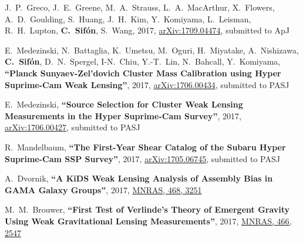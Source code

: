 \documentclass{article}
\def\myself{\textbf{\color{red} C.~Sif\'on}}
\def\apj{ApJ}
\def\mnras{MNRAS}
\def\pasj{PASJ}
\newcommand{\submitted}[1]{submitted to #1}
\newcommand{\paper}[1]{\textbf{``#1''}}
\begin{document}
\vspace{-0.5cm}
\begin{etaremune}

\item
J.~P.~Greco, J.~E.~Greene, M.~A.~Strauss, L.~A.~MacArthur, X.~Flowers, 
A.~D.~Goulding, S.~Huang, J.~H.~Kim, Y.~Komiyama, L.~Leisman, R.~H.~Lupton, 
\myself, S.~Wang,
2017, \href{http://adsabs.harvard.edu/abs/2017arXiv170904474}{arXiv:1709.04474},
\submitted{\apj}

\item
E.~Medezinski, N.~Battaglia, K.~Umetsu, M.~Oguri, H.~Miyatake, A.~Nishizawa,
\myself, D.~N.~Spergel, I-N.~Chiu, Y.-T.~Lin, N.~Bahcall, Y.~Komiyama,
\paper{Planck Sunyaev-Zel'dovich Cluster Mass Calibration using Hyper 
Suprime-Cam Weak Lensing},
2017, \href{http://adsabs.harvard.edu/abs/2017arXiv170600434M}{arXiv:1706.00434},
\submitted{\pasj}

\item
E.~Medezinski, 
\paper{Source Selection for Cluster Weak Lensing Measurements in the Hyper Suprime-Cam
Survey},
2017, \href{http://adsabs.harvard.edu/abs/2017arXiv170600427M}{arXiv:1706.00427},
\submitted{\pasj}

\item
R.~Mandelbaum, 
\paper{The First-Year Shear Catalog of the Subaru Hyper Suprime-Cam SSP Survey},
2017, \href{http://adsabs.harvard.edu/abs/2017arXiv170506745M}{arXiv:1705.06745},
\submitted{\pasj}

\item
A.~Dvornik, 
\paper{A KiDS Weak Lensing Analysis of Assembly Bias in GAMA Galaxy Groups},
2017, \href{http://adsabs.harvard.edu/abs/2017MNRAS.468.3251D}{\mnras, 468, 3251}

\item
M.~M.~Brouwer, 
\paper{First Test of Verlinde's Theory of Emergent Gravity Using Weak 
Gravitational Lensing Measurements},
2017, \href{http://adsabs.harvard.edu/abs/2017MNRAS.466.2547B}{\mnras, 466, 2547}


\end{etaremune}
\end{document}
